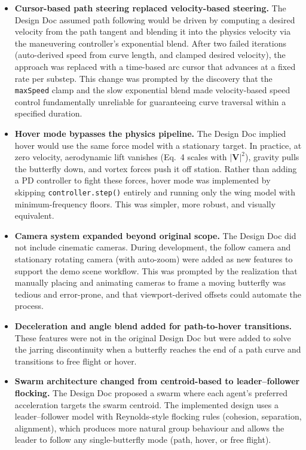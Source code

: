 \documentclass[12pt]{article}
\begin{document}
\begin{itemize}
  \item \textbf{Cursor-based path steering replaced velocity-based steering.}
    The Design Doc assumed path following would be driven by computing a
    desired velocity from the path tangent and blending it into the physics
    velocity via the maneuvering controller's exponential blend. After two
    failed iterations (auto-derived speed from curve length, and clamped
    desired velocity), the approach was replaced with a time-based arc cursor
    that advances at a fixed rate per substep. This change was prompted by the
    discovery that the \texttt{maxSpeed} clamp and the slow exponential blend
    made velocity-based speed control fundamentally unreliable for guaranteeing
    curve traversal within a specified duration.

  \item \textbf{Hover mode bypasses the physics pipeline.} The Design Doc
    implied hover would use the same force model with a stationary target.
    In practice, at zero velocity, aerodynamic lift vanishes (Eq.~4 scales
    with $|\mathbf{V}|^2$), gravity pulls the butterfly down, and vortex
    forces push it off station. Rather than adding a PD controller to fight
    these forces, hover mode was implemented by skipping
    \texttt{controller.step()} entirely and running only the wing model with
    minimum-frequency floors. This was simpler, more robust, and visually
    equivalent.

  \item \textbf{Camera system expanded beyond original scope.} The Design Doc
    did not include cinematic cameras. During development, the follow camera
    and stationary rotating camera (with auto-zoom) were added as new features
    to support the demo scene workflow. This was prompted by the realization
    that manually placing and animating cameras to frame a moving butterfly
    was tedious and error-prone, and that viewport-derived offsets could
    automate the process.

  \item \textbf{Deceleration and angle blend added for path-to-hover
    transitions.} These features were not in the original Design Doc but were
    added to solve the jarring discontinuity when a butterfly reaches the end
    of a path curve and transitions to free flight or hover.

  \item \textbf{Swarm architecture changed from centroid-based to
    leader--follower flocking.} The Design Doc proposed a swarm where each
    agent's preferred acceleration targets the swarm centroid. The implemented
    design uses a leader--follower model with Reynolds-style flocking rules
    (cohesion, separation, alignment), which produces more natural group
    behaviour and allows the leader to follow any single-butterfly mode
    (path, hover, or free flight).


\end{itemize}
\end{document}

